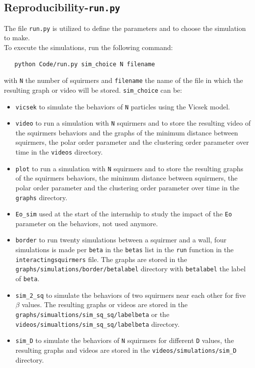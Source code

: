 \documentclass{article}
\begin{document}
\subsection{Reproducibility-\texttt{run.py}}
The file \texttt{run.py} is utilized to define the parameters and to choose the simulation to make.\\
 To execute the simulations, run the following command:
 \begin{verbatim}
   python Code/run.py sim_choice N filename
\end{verbatim} 
with \texttt{N} the number of squirmers and \texttt{filename} the name of the file in which the resulting graph or video will be stored.
\texttt{sim\_choice} can be:
\begin{itemize}
   \item \texttt{vicsek} to simulate the behaviors of \texttt{N} particles using the Vicsek model.
   \item \texttt{video} to run a simulation with \texttt{N} squirmers and to store the resulting video of the squirmers behaviors and the graphs of the 
   minimum distance between squirmers, the polar order parameter and the clustering order parameter over time
    in the \texttt{videos} directory.
   \item \texttt{plot} to run a simulation with \texttt{N} squirmers and to store the resulting graphs of the squirmers behaviors, the
   minimum distance between squirmers, the polar order parameter and the clustering order parameter over time
    in the \texttt{graphs} directory.
   \item \texttt{Eo\_sim} used at the start of the internship to study the impact of the \texttt{Eo} parameter on the behaviors,
   not used anymore.
   \item \texttt{border} to run twenty simulations between a squirmer and a wall, four simulations is made per \texttt{beta} in the \texttt{betas}
   list in the \texttt{run} function in the \texttt{interactingsquirmers} file. The graphs are stored in the \texttt{graphs/simulations/border/betalabel}
   directory with \texttt{betalabel} the label of \texttt{beta}.
   \item \texttt{sim\_2\_sq} to simulate the behaviors of two squirmers near each other for five $\beta$ values. The
   resulting graphs or videos are stored in the \texttt{graphs/simualtions/sim\_sq\_sq/labelbeta} or the \texttt{videos/simualtions/sim\_sq\_sq/labelbeta}
   directory.
   \item \texttt{sim\_D} to simulate the behaviors of \texttt{N} squirmers for different \texttt{D} values, the resulting graphs
   and videos are stored in the \texttt{videos/simulations/sim\_D} directory.
\end{itemize}
\end{document}
